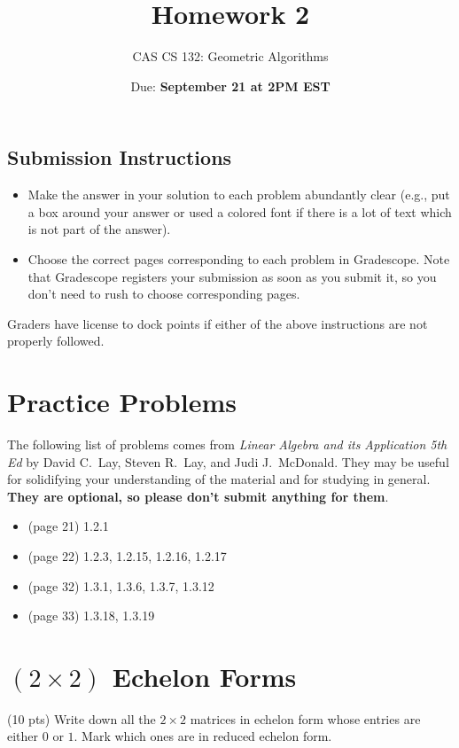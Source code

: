\documentclass{article}
\title{Homework 2}
\author{CAS CS 132: Geometric Algorithms}
\date{Due: \textbf{September 21 at 2PM EST}}
\theoremstyle{remark}
\begin{document}
\maketitle

\subsection*{Submission Instructions}
\begin{itemize}
\item Make the answer in your solution to each problem abundantly clear (e.g., put a box around your answer or used a colored font if there is a lot of text which is not part of the answer).
\item Choose the correct pages corresponding to each problem in Gradescope. Note that Gradescope registers your submission as soon as you submit it, so you don't need to rush to choose corresponding pages.
\end{itemize}
Graders have license to dock points if either of the above instructions are not properly followed.


\section*{Practice Problems}

The following list of problems comes from \textit{Linear Algebra and its Application 5th Ed} by David C.\ Lay, Steven R.\ Lay, and Judi J.\ McDonald.
They may be useful for solidifying your understanding of the material and for studying in general.
\textbf{They are optional, so please don't submit anything for them}.

\begin{itemize}
\item
  (page 21) 1.2.1
\item
  (page 22) 1.2.3, 1.2.15, 1.2.16, 1.2.17
\item
  (page 32) 1.3.1, 1.3.6, 1.3.7, 1.3.12
\item
  (page 33) 1.3.18, 1.3.19
\end{itemize}

\pagebreak
\section{$(2 \times 2)$ Echelon Forms}

(10 pts) Write down all the $2 \times 2$ matrices in echelon form whose entries are either $0$ or $1$.
Mark which ones are in reduced echelon form.
\end{document}
